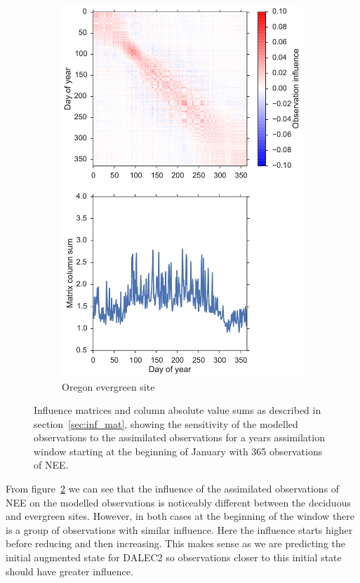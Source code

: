 \documentclass[11pt]{article}
\begin{document}
\begin{figure}[ht]
\begin{subfigure}[b]{0.46\textwidth}
        \includegraphics[width=\textwidth]{inf_mat_so.pdf}
        \caption{Oregon evergreen site}
        \label{fig:oregon_inf_mat}
    \end{subfigure}
    \caption{Influence matrices and column absolute value sums as described in section~\ref{sec:inf_mat}, showing the sensitivity of the modelled observations to the assimilated observations for a years assimilation window starting at the beginning of January with 365 observations of NEE.}
    \label{fig:inf_mats}
\end{figure}

From figure~\ref{fig:inf_mats} we can see that the influence of the assimilated observations of NEE on the modelled observations is noticeably different between the deciduous and evergreen sites. However, in both cases at the beginning of the window there is a group of observations with similar influence. Here the influence starts higher before reducing and then increasing. This makes sense as we are predicting the initial augmented state for DALEC2 so observations closer to this initial state should have greater influence. 
\end{document}
